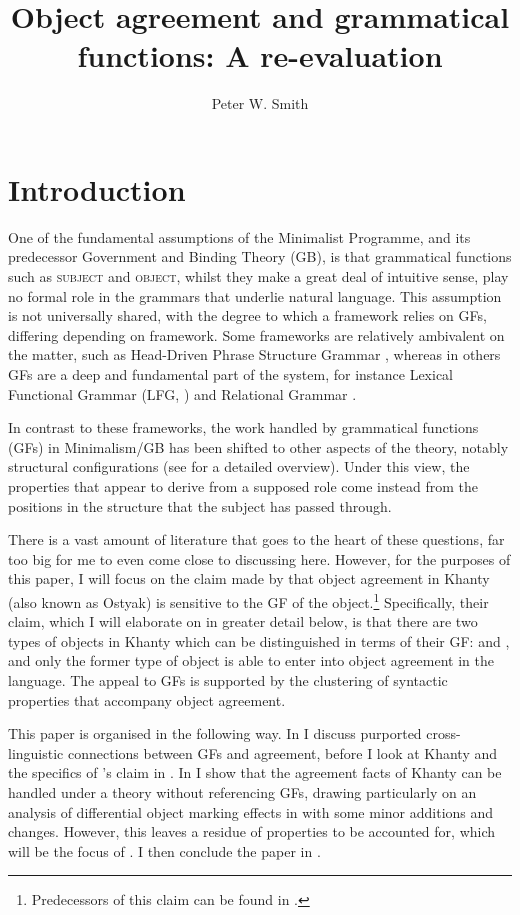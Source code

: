 \documentclass[output=paper
,modfonts
,nonflat]{langsci/langscibook}
\title{Object agreement and grammatical functions: A re-evaluation}
\author{Peter W. Smith\affiliation{Goethe-Universität Frankfurt am Main}}
\begin{document}
\maketitle

\section{Introduction}

One of the fundamental assumptions of the Minimalist Programme, and its predecessor Government and Binding Theory (GB), is that grammatical functions such as \textsc{subject} and \textsc{object}, whilst they make a great deal of intuitive sense, play no formal role in the grammars that underlie natural language.
This assumption is not universally shared, with the degree to which a framework relies on GFs, differing depending on framework.
Some frameworks are relatively ambivalent on the matter, such as Head-Driven Phrase Structure Grammar \citep{pollardsag1994}, whereas in others GFs are a deep and fundamental part of the system, for instance Lexical Functional Grammar (LFG, \citealt{dalrymple2001}) and Relational Grammar \citep{perlmutterpostal1983}.

In contrast to these frameworks, the work handled by grammatical functions (GFs) in Minimalism/GB has been shifted to other aspects of the theory, notably structural configurations (see \citealt{mccloskey1997} for a detailed overview).
Under this view, the properties that appear to derive from a supposed \subj{} role come instead from the positions in the structure that the subject has passed through.

There is a vast amount of literature that goes to the heart of these questions, far too big for me to even come close to discussing here. However, for the purposes of this paper, I will focus on the claim made by \citet{dn2011} that object agreement in Khanty (also known as Ostyak) is sensitive to the GF of the object.\footnote{Predecessors of this claim can be found in \citet{nikolaeva1999,ostyakgrammar,nikolaeva2001}.}
Specifically, their claim, which I will elaborate on in greater detail below, is that there are two types of objects in Khanty which can be distinguished in terms of their GF: \object{} and \robj, and only the former type of object is able to enter into object agreement in the language.
The appeal to GFs is supported by the clustering of syntactic properties that accompany object agreement.

This paper is organised in the following way. In  I discuss purported cross-linguistic connections between GFs and agreement, before I look at Khanty and the specifics of \citet{dn2011}'s claim in .
In  I show that the agreement facts of Khanty can be handled under a theory without referencing GFs, drawing particularly on an analysis of differential object marking effects in \citet{Baker2015} with some minor additions and changes.
However, this leaves a residue of properties to be accounted for, which will be the focus of .
I then conclude the paper in .
\end{document}

